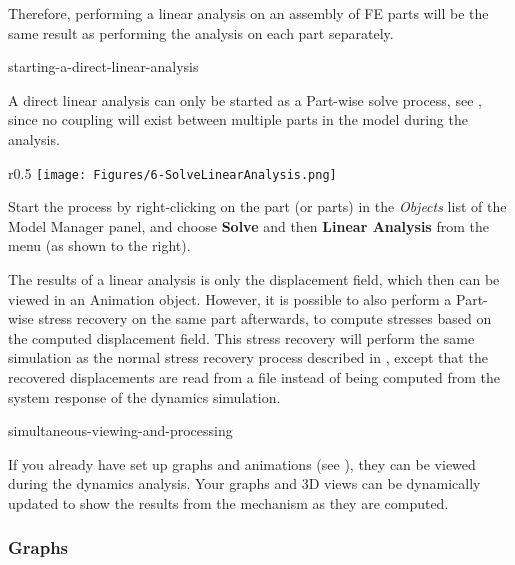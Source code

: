 Therefore, performing a linear analysis on an assembly of FE parts will be the
same result as performing the analysis on each part separately.


           {starting-a-direct-linear-analysis}

A direct linear analysis can only be started as a Part-wise solve process, see
, since
no coupling will exist between multiple parts in the model during the analysis.

\begin{wrapfigure}[16]{r}{0.5\textwidth}
  \texttt{[image: Figures/6-SolveLinearAnalysis.png]}
\end{wrapfigure}

Start the process by right-clicking on the part (or parts) in the {\sl Objects}
list of the Model Manager panel, and choose \textbf{Solve} and then
\textbf{Linear Analysis} from the menu (as shown to the right).

The results of a linear analysis is only the displacement field, which then can
be viewed in an Animation object. However, it is possible to also perform
a Part-wise stress recovery on the same part afterwards, to compute stresses
based on the computed displacement field. This stress recovery will perform the
same simulation as the normal stress recovery process described in
,
except that the recovered displacements are read from a file instead of being
computed from the system response of the dynamics simulation.




           {simultaneous-viewing-and-processing}

If you already have set up graphs and animations (see
),
they can be viewed during the dynamics analysis.
Your graphs and 3D views can be dynamically updated to show the results from the
mechanism as they are computed.

\subsubsection{Graphs}


